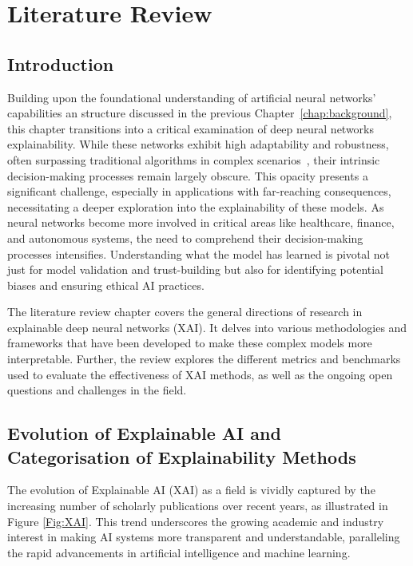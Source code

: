 \chapter{Literature Review}
\label{chap:lit}
\section{Introduction}

Building upon the foundational understanding of artificial neural networks' capabilities an structure discussed in the previous Chapter~\ref{chap:background}, this chapter transitions into a critical examination of deep neural networks explainability. While these networks exhibit high adaptability and robustness, often surpassing traditional algorithms in complex scenarios~\cite{HeZRS16, SilverHMGSDSAPL16, DengHK13, LeCunBH15}, their intrinsic decision-making processes remain largely obscure. This opacity presents a significant challenge, especially in applications with far-reaching consequences, necessitating a deeper exploration into the explainability of these models. As neural networks become more involved in critical areas like healthcare, finance, and autonomous systems, the need to comprehend their decision-making processes intensifies. Understanding what the model has learned is pivotal not just for model validation and trust-building but also for identifying potential biases and ensuring ethical AI practices. 

The literature review chapter covers the general directions of research in explainable deep neural networks (XAI). It delves into various methodologies and frameworks that have been developed to make these complex models more interpretable. Further, the review explores the different metrics and benchmarks used to evaluate the effectiveness of XAI methods, as well as the ongoing open questions and challenges in the field.

\section{Evolution of Explainable AI and Categorisation of Explainability Methods}

The evolution of Explainable AI (XAI) as a field is vividly captured by the increasing number of scholarly publications over recent years, as illustrated in Figure \ref{Fig:XAI}. This trend underscores the growing academic and industry interest in making AI systems more transparent and understandable, paralleling the rapid advancements in artificial intelligence and machine learning.

